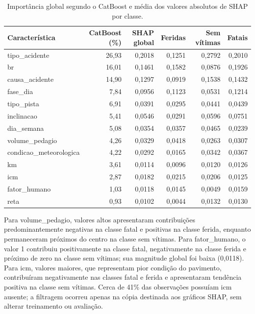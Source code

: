 \documentclass[12pt]{article}
\begin{document}
\begin{table}[ht]
\centering
\scriptsize
\caption{Importância global segundo o CatBoost e média dos valores absolutos de SHAP por classe.}
\label{tab:importancia-shap}
\begin{tabular}{lrrrrr}
\hline
\textbf{Característica} & \textbf{CatBoost (\%)} & \textbf{SHAP global} & \textbf{Feridas} & \textbf{Sem vítimas} & \textbf{Fatais} \\
\hline
tipo\_acidente & 26,93 & 0,2018 & 0,1251 & 0,2792 & 0,2010 \\
br & 16,01 & 0,1461 & 0,1582 & 0,0876 & 0,1926 \\
causa\_acidente & 14,90 & 0,1297 & 0,0919 & 0,1538 & 0,1432 \\
fase\_dia & 7,84 & 0,0956 & 0,1123 & 0,0531 & 0,1214 \\
tipo\_pista & 6,91 & 0,0391 & 0,0295 & 0,0441 & 0,0439 \\
inclinacao & 5,41 & 0,0546 & 0,0291 & 0,0596 & 0,0751 \\
dia\_semana & 5,08 & 0,0354 & 0,0357 & 0,0465 & 0,0239 \\
volume\_pedagio & 4,26 & 0,0329 & 0,0418 & 0,0263 & 0,0307 \\
condicao\_meteorologica & 4,22 & 0,0292 & 0,0165 & 0,0342 & 0,0367 \\
km & 3,61 & 0,0114 & 0,0096 & 0,0120 & 0,0126 \\
icm & 2,87 & 0,0182 & 0,0215 & 0,0206 & 0,0125 \\
fator\_humano & 1,03 & 0,0118 & 0,0145 & 0,0049 & 0,0159 \\
reta & 0,93 & 0,0102 & 0,0044 & 0,0132 & 0,0130 \\
\hline
\end{tabular}
\end{table}

Para volume\_pedagio, valores altos apresentaram contribuições predominantemente negativas na classe fatal e positivas na classe ferida, enquanto permaneceram próximos do centro na classe sem vítimas. Para fator\_humano, o valor 1 contribuiu positivamente na classe fatal, negativamente na classe ferida e próximo de zero na classe sem vítimas; sua magnitude global foi baixa (0,0118). Para icm, valores maiores, que representam pior condição do pavimento, contribuíram negativamente nas classes fatal e ferida e apresentaram tendência positiva na classe sem vítimas. Cerca de 41\% das observações possuíam icm ausente; a filtragem ocorreu apenas na cópia destinada aos gráficos SHAP, sem alterar treinamento ou avaliação.
\end{document}
